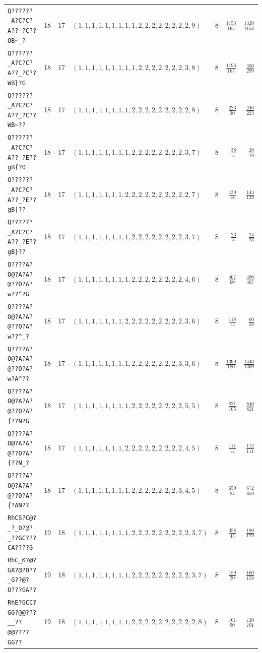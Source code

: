 \documentclass[paper=a4,fontsize=10.5pt,jafontsize=10.5pt]{jlreq}
\theoremstyle{plain}
\theoremstyle{definition}
\begin{document}
\begin{table}[htbp]
\begin{tabular}{llrlrrr}
\texttt{Q??????\_A?C?C?A??\_?C??OB\textasciitilde{}\_?} & 18 & 17 & $(1,1,1,1,1,1,1,1,1,2,2,2,2,2,2,2,2,9)$ & 8 & $\frac{1153}{165}$ & $\frac{1320}{1153}$ \\
\texttt{Q??????\_A?C?C?A??\_?C??WB\}?G} & 18 & 17 & $(1,1,1,1,1,1,1,1,1,2,2,2,2,2,2,2,3,8)$ & 8 & $\frac{1196}{165}$ & $\frac{330}{299}$ \\
\texttt{Q??????\_A?C?C?A??\_?C??WB\textasciitilde{}??} & 18 & 17 & $(1,1,1,1,1,1,1,1,2,2,2,2,2,2,2,2,2,8)$ & 8 & $\frac{223}{30}$ & $\frac{240}{223}$ \\
\texttt{Q??????\_A?C?C?A??\_?E??gB\{?O} & 18 & 17 & $(1,1,1,1,1,1,1,1,2,2,2,2,2,2,2,2,3,7)$ & 8 & $\frac{38}{5}$ & $\frac{20}{19}$ \\
\texttt{Q??????\_A?C?C?A??\_?E??gB|??} & 18 & 17 & $(1,1,1,1,1,1,1,2,2,2,2,2,2,2,2,2,2,7)$ & 8 & $\frac{139}{18}$ & $\frac{144}{139}$ \\
\texttt{Q??????\_A?C?C?A??\_?E??gB\}??} & 18 & 17 & $(1,1,1,1,1,1,1,1,2,2,2,2,2,2,2,2,3,7)$ & 8 & $\frac{23}{3}$ & $\frac{24}{23}$ \\
\texttt{Q????A?O@?A?A?@??O?A?w??\textasciicircum{}?G} & 18 & 17 & $(1,1,1,1,1,1,1,1,2,2,2,2,2,2,2,2,4,6)$ & 8 & $\frac{467}{60}$ & $\frac{480}{467}$ \\
\texttt{Q????A?O@?A?A?@??O?A?w??\textasciicircum{}\_?} & 18 & 17 & $(1,1,1,1,1,1,1,2,2,2,2,2,2,2,2,2,3,6)$ & 8 & $\frac{118}{15}$ & $\frac{60}{59}$ \\
\texttt{Q????A?O@?A?A?@??O?A?w?A\textasciicircum{}??} & 18 & 17 & $(1,1,1,1,1,1,1,1,2,2,2,2,2,2,2,3,3,6)$ & 8 & $\frac{1399}{180}$ & $\frac{1440}{1399}$ \\
\texttt{Q????A?O@?A?A?@??O?A?\{??N?G} & 18 & 17 & $(1,1,1,1,1,1,1,1,2,2,2,2,2,2,2,2,5,5)$ & 8 & $\frac{821}{105}$ & $\frac{840}{821}$ \\
\texttt{Q????A?O@?A?A?@??O?A?\{??N\_?} & 18 & 17 & $(1,1,1,1,1,1,1,2,2,2,2,2,2,2,2,2,4,5)$ & 8 & $\frac{111}{14}$ & $\frac{112}{111}$ \\
\texttt{Q????A?O@?A?A?@??O?A?\{?AN??} & 18 & 17 & $(1,1,1,1,1,1,1,1,2,2,2,2,2,2,2,3,4,5)$ & 8 & $\frac{659}{84}$ & $\frac{672}{659}$ \\
\texttt{RhCS?C@?\_?\_O?@?\_??GC???CA????G} & 19 & 18 & $(1,1,1,1,1,1,1,1,2,2,2,2,2,2,2,2,2,3,7)$ & 8 & $\frac{358}{45}$ & $\frac{180}{179}$ \\
\texttt{RhC\_K?@?GA?@?O??\_G??@?O???GA??} & 19 & 18 & $(1,1,1,1,1,1,1,1,2,2,2,2,2,2,2,2,2,3,7)$ & 8 & $\frac{159}{20}$ & $\frac{160}{159}$ \\
\texttt{RhE?GCC?GG?@@???\_\_??@@????GG??} & 19 & 18 & $(1,1,1,1,1,1,1,1,2,2,2,2,2,2,2,2,2,2,8)$ & 8 & $\frac{701}{90}$ & $\frac{720}{701}$ \\

\end{tabular}
\end{table}
\end{document}
